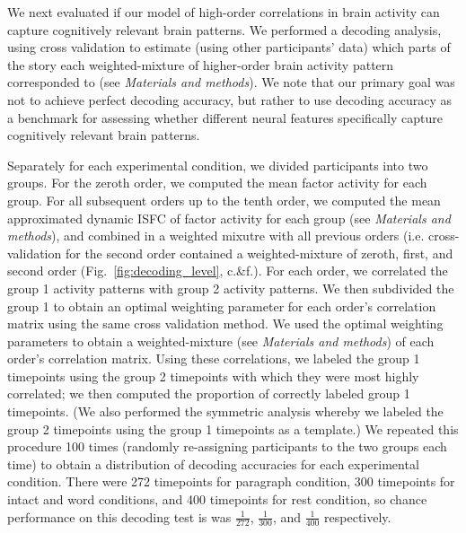 \documentclass[english]{article}
\begin{document}
We next evaluated if our model of high-order correlations in brain activity can capture cognitively relevant brain patterns. We performed a decoding analysis, using cross validation to estimate (using other participants’ data) which parts of the story each weighted-mixture of higher-order brain activity pattern corresponded to (see \textit{Materials and methods}). We note that our primary goal was not to achieve perfect decoding accuracy, but rather to use decoding accuracy as a benchmark for assessing whether different neural features specifically capture cognitively relevant brain patterns.

Separately for each experimental condition, we divided participants
into two groups. For the zeroth order, we computed the mean factor
activity for each group.  For all subsequent orders up to the tenth
order, we computed the mean approximated dynamic ISFC of factor
activity for each group (see \textit{Materials and methods}), and
combined in a weighted mixutre with all previous orders
(i.e. cross-validation for the second
order contained a weighted-mixture of zeroth, first, and second order
(Fig.~\ref{fig:decoding_level}, c.\&f.).  For
each order, we correlated the group 1 activity patterns with group 2
activity patterns.  We then subdivided the group 1 to obtain an
optimal weighting parameter for each order’s correlation matrix using
the same cross validation method. We used the optimal weighting
parameters to obtain a weighted-mixture (see \textit{Materials and methods}) of each order’s correlation
matrix. Using these correlations, we labeled the group 1 timepoints
using the group 2 timepoints with which they were most highly
correlated; we then computed the proportion of correctly labeled group
1 timepoints. (We also performed the symmetric analysis whereby we
labeled the group 2 timepoints using the group 1 timepoints as a
template.) We repeated this procedure 100 times (randomly re-assigning
participants to the two groups each time) to obtain a distribution of
decoding accuracies for each experimental condition. There were 272
timepoints for paragraph condition, 300 timepoints for intact and word
conditions, and 400 timepoints for rest condition,  so chance
performance on this decoding test is was $\frac{1}{272}$,
$\frac{1}{300}$, and $\frac{1}{400}$ respectively.
 
\end{document}
